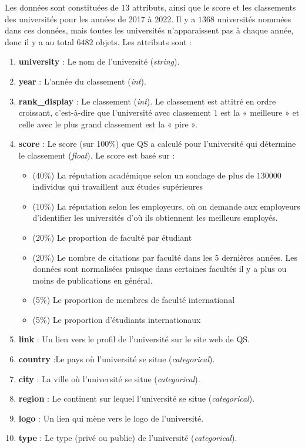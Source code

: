 \documentclass[twocolumns]{udes_rapport}
\begin{document}
    Les données sont constituées de $13$ attributs, ainsi que le score et les classements des universités pour les années de 2017 à 2022. Il y a $1368$ universités nommées dans ces données, mais toutes les universités n’apparaissent pas à chaque année, donc il y a au total $6482$ objets. Les attributs sont :
    
    \begin{enumerate}
        \item \textbf{university} : Le nom de l’université (\emph{string}).
        \item \textbf{year} : L’année du classement (\emph{int}). 
        \item \textbf{rank\_display} : Le classement (\emph{int}). Le classement est attitré en ordre croissant, c’est-à-dire que l’université avec classement $1$ est la « meilleure » et celle avec le plus grand classement est la « pire ».
        \item \textbf{score} : Le score (sur 100\%) que QS a calculé pour l’université qui détermine le classement (\emph{float}). Le score est basé sur \cite{score}:
        \begin{itemize}
            \item (40\%) La réputation académique selon un sondage de plus de $130 000$ individus qui travaillent aux études supérieures
            \item (10\%) La réputation selon les employeurs, où on demande aux employeurs d’identifier les universités d’où ils obtiennent les meilleurs employés.
            \item (20\%) Le proportion de faculté par étudiant
            \item (20\%) Le nombre de citations par faculté dans les 5 dernières années. Les données sont normalisées puisque dans certaines facultés il y a plus ou moins de publications en général.
            \item (5\%) Le proportion de membres de faculté international
            \item (5\%) Le proportion d’étudiants internationaux
        \end{itemize}
        \item \textbf{link} : Un lien vers le profil de l’université sur le site web de QS.
        \item  \textbf{country} :Le pays où l’université se situe (\emph{categorical}).
        \item \textbf{city} : La ville où l’université se situe (\emph{categorical}).
        \item \textbf{region} : Le continent sur lequel l’université se situe (\emph{categorical}).
        \item \textbf{logo} : Un lien qui mène vers le logo de l’université.
        \item \textbf{type} : Le type (privé ou public) de l'université (\emph{categorical}).
        

\end{enumerate}
\end{document}
